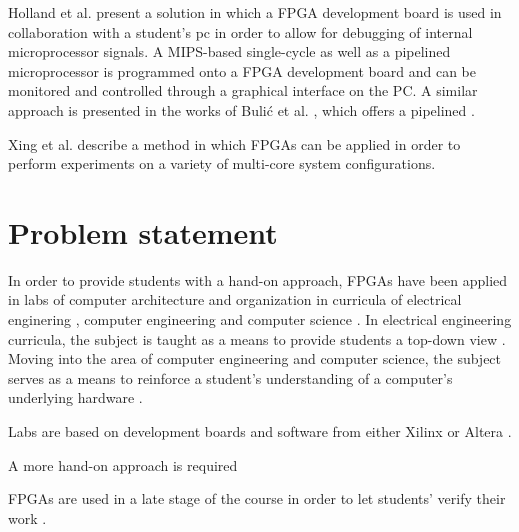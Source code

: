 \documentclass[openright]{template/uva-bachelor-thesis}
\begin{document}
Holland et al. \cite{holland2003harnessing} present a solution in which a FPGA development board is used in collaboration with a student's pc in order to allow for debugging of internal microprocessor signals. A MIPS-based single-cycle as well as a pipelined microprocessor is programmed onto a FPGA development board and can be monitored and controlled through a graphical interface on the PC. A similar approach is presented in the works of Buli\'c et al. \cite{bulic2013fpga}, which offers a pipelined . 

Xing et al. \cite{xing2008fpga} describe a method in which FPGAs can be applied in order to perform experiments on a variety of multi-core system configurations. 

\section{Problem statement}
\label{sectionproblemstatement}

In order to provide students with a hand-on approach, FPGAs have been applied in labs of computer architecture and organization in curricula of electrical enginering \cite{jansen2014every, oztekin2011bzk, el2011teaching, pereira2012basic}, computer engineering \cite{cifredo2015computer, kellett2012project, el2011teaching, pereira2012basic, lee2012pipelined, oztekin2011bzk} and computer science \cite{bulic2013fpga, el2011teaching, pereira2012basic, lee2012pipelined}. In electrical engineering curricula, the subject is taught as a means to provide students a top-down view \cite{jansen2014every}. Moving into the area of computer engineering and computer science, the subject serves as a means to reinforce a student's understanding of a computer's underlying hardware \cite{cifredo2015computer, el2011teaching, lee2012pipelined}. 

Labs are based on development boards and software from either Xilinx \cite{al2007teaching, wang2011bridging, nakano2008processor, paharsingh2009novel, bulic2013fpga} or Altera \cite{xing2008fpga, oztekin2011bzk, lee2012pipelined, el2011teaching, kellett2012project, jansen2014every}.

 
A more hand-on approach is required \cite{cifredo2015computer, oztekin2011bzk}

FPGAs are used in a late stage of the course in order to let students' verify their work \cite{wang2011bridging}.
\end{document}
